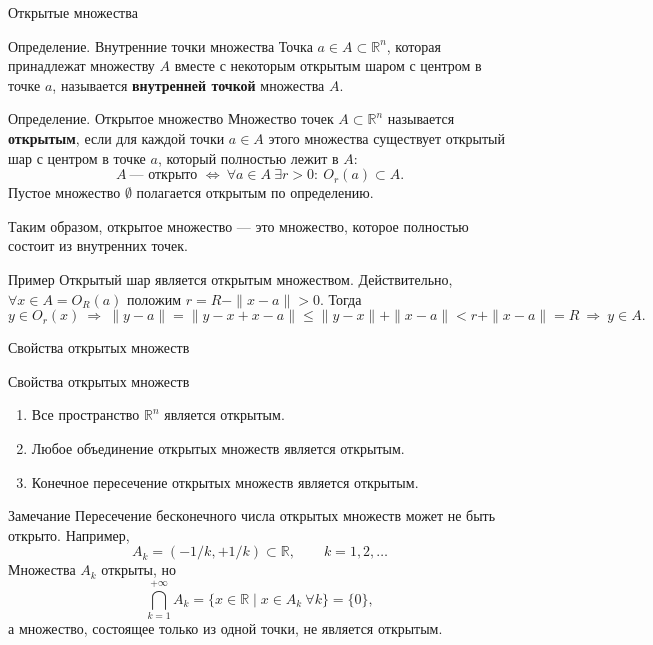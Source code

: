 \documentclass[8pt]{beamer}
\begin{document}
\begin{frame}{Открытые множества}
\begin{block}{Определение. Внутренние точки множества}
Точка $a\in A\subset\mathbb{R}^n$, которая принадлежат множеству $A$ вместе с некоторым открытым шаром с центром в точке $a$, называется {\bf внутренней точкой} множества $A$.
\end{block}
\begin{block}{Определение. Открытое множество}
Множество точек $A\subset\mathbb{R}^n$ называется {\bf открытым}, если для каждой точки $a\in A$ этого множества существует открытый шар с центром в точке $a$, который полностью лежит в $A$:
$$A\ \text{--- открыто }\iff\ \forall a\in A\ \exists r>0:\ O_r(a)\subset A.$$
Пустое множество $\emptyset$ полагается открытым по определению.
\end{block}
Таким образом, открытое множество --- это множество, которое полностью состоит из внутренних точек.
\begin{block}{Пример}
Открытый шар является открытым множеством. Действительно, $\forall x\in A= O_R(a)$ положим $r = R - \|x-a\|>0$. Тогда
$$y\in O_r(x) \ \Rightarrow\  \|y -a\| =\| y-x+x-a\|\le \|y-x\|+\|x-a\|<r+\|x-a\| = R\ \Rightarrow\ y\in A.$$
\end{block}
\end{frame}

\begin{frame}{Свойства открытых множеств}
\begin{block}{Свойства открытых множеств}
\begin{enumerate}
\item Все пространство $\mathbb{R}^n$ является открытым.
\item Любое объединение открытых множеств является открытым.
\item Конечное пересечение открытых множеств является открытым.
\end{enumerate}
\end{block}
\begin{block}{Замечание}
Пересечение бесконечного числа открытых множеств может не быть открыто. Например,
$$A_k = (-1/k,+1/k)\subset \mathbb{R},\qquad k=1,2,\ldots$$
Множества $A_k$ открыты, но
$$\bigcap\limits_{k=1}^{+\infty}A_k = \{ x\in\mathbb{R}\mid x\in A_k\ \forall k\} = \{0\},$$
а множество, состоящее только из одной точки, не является открытым.
\end{block}
\end{frame}
\end{document}
